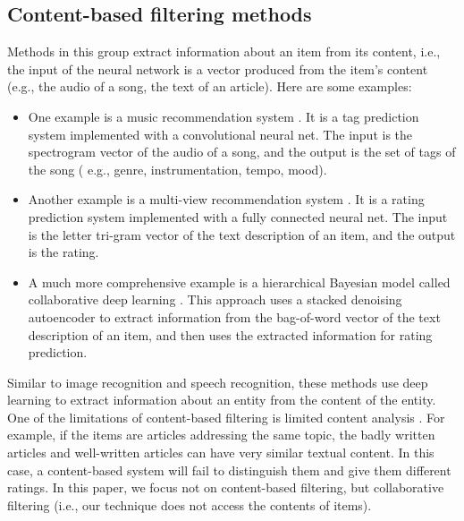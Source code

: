 \documentclass[12pt]{WSUThesis}
\theoremstyle{definition}
\begin{document}
\subsection{Content-based filtering methods}
Methods in this group extract information about an item from its content, 
i.e., the input of the neural network is a vector produced from the item's 
content (e.g., the audio of a song, the text of an article). Here are some 
examples:
\begin{itemize}
	\item One example is a music recommendation system 	\cite{van2013deep}. 
	It is a tag prediction system implemented with a convolutional neural net. 
	The input is the spectrogram vector of the audio of a song,
	and the output 	is the set of tags of the song (
	e.g., genre, instrumentation, tempo, mood).
	\item Another example is a multi-view recommendation system 	
	\cite{elkahky2015multi}. 
	It is a rating prediction system implemented with a fully connected 
	neural net.
	The input is the letter tri-gram vector of the text description of an item, 
	and the output is the rating.
	\item A much more comprehensive example is a hierarchical Bayesian model 
	called collaborative deep learning \cite{wang2015collaborative}.
	This approach uses a stacked denoising autoencoder to extract information 
	from the bag-of-word vector of the text description of an item,
	and then uses the extracted information for rating prediction.
\end{itemize}
Similar to image recognition and speech recognition, these methods use deep 
learning to extract information about an entity from the content of the entity.
One of the limitations of content-based filtering is limited content analysis 
\cite{adomavicius2005toward}.
For example, if the items are articles addressing the same topic,
the badly written articles and well-written articles can have very similar 
textual content. In this case, a content-based system will fail to distinguish 
them and give them different ratings.
In this paper, we focus not on content-based filtering, but collaborative 
filtering (i.e., our technique does not access the contents of items).
\end{document}
